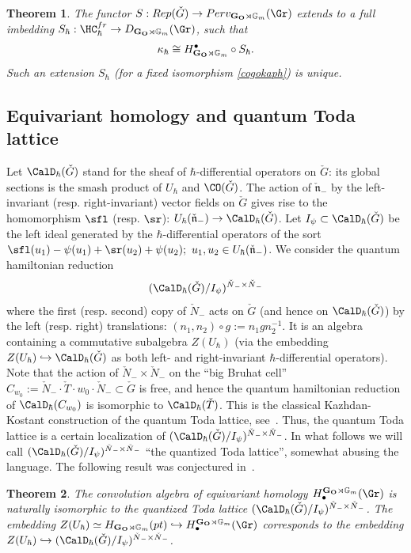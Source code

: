 \documentclass[11pt]{amsart}
\newtheorem{thm}{Theorem}
\theoremstyle{definition}
\theoremstyle{remark}
\theoremstyle{remark}
\newcommand{\<}{\langle}
\renewcommand{\>}{\rangle}
\newcommand{\Ln}{\check{\mathfrak n}{}}
\newcommand{\LN}{\check{N}{}}
\newcommand{\LG}{{\check{G}}}
\newcommand{\LT}{\check{T}{}}
\newcommand{\GO}{{\bf G_O}}
\newcommand{\Gm}{{{\mathbb G}_m}}
\newcommand{\Sa}{S}
\newcommand{\HChfr}{\HC_\hbar^{fr}}
\newcommand{\kappah}{{\kappa_\hbar}}
\begin{document}
\begin{thm}
\label{free_cohh}
The functor $\Sa: Rep(\LG)\to Perv_{\GO\rtimes \Gm}(\Gr)$ 
extends to a full imbedding $\Sa_\hbar:\HChfr \to
D_{\GO\rtimes \Gm}(\Gr)$, such that 
\begin{equation}\label{cogokaph}
\kappah \cong H_{\GO\rtimes\Gm}^\bullet\circ \Sa_\hbar.
\end{equation}
Such an extension $\Sa_\hbar$ (for a  fixed isomorphism \eqref{cogokaph})
is unique.
\end{thm}



\subsection{Equivariant homology and quantum Toda lattice}
Let $\CalD_\hbar(\LG)$ stand for the sheaf of $\hbar$-differential
operators on $\LG$: its global sections is the smash product of 
$U_\hbar$ and $\CO(\LG)$. The action of $\Ln_-$ by the left-invariant
(resp. right-invariant) vector fields on $\LG$ gives rise to the
homomorphism $\sfl$ (resp. $\sr$): $U_\hbar(\Ln_-)\to\CalD_\hbar(\LG)$.
Let $I_\psi\subset\CalD_\hbar(\LG)$ be the left ideal generated by the
$\hbar$-differential operators of the sort
$\sfl(u_1)-\psi(u_1)+\sr(u_2)+\psi(u_2);\ u_1,u_2\in U_\hbar(\Ln_-)$.
We consider the quantum hamiltonian reduction 
$$(\CalD_\hbar(\LG)/I_\psi)^{\LN_-\times\LN_-}$$
where the first (resp. second) copy of $\LN_-$ acts on $\LG$ (and hence
on $\CalD_\hbar(\LG)$) by the left
(resp. right) translations: $(n_1,n_2)\circ g:=n_1gn_2^{-1}$. 
It is an algebra containing a commutative subalgebra $Z(U_\hbar)$
(via the embedding $Z(U_\hbar)\hookrightarrow\CalD_\hbar(\LG)$ as both
left- and right-invariant $\hbar$-differential operators).
Note that the action of $\LN_-\times\LN_-$ on the ``big Bruhat cell'' 
$C_{w_0}:=\LN_-\cdot\LT\cdot w_0\cdot\LN_-\subset\LG$ is free, and
hence the quantum hamiltonian reduction of $\CalD_\hbar(C_{w_0})$ is
isomorphic to $\CalD_\hbar(\LT)$. This is the classical
Kazhdan-Kostant construction of the quantum Toda lattice,
see~\cite{K2}. Thus, the quantum Toda lattice is a certain
localization of $(\CalD_\hbar(\LG)/I_\psi)^{\LN_-\times\LN_-}$.
In what follows we will call
$(\CalD_\hbar(\LG)/I_\psi)^{\LN_-\times\LN_-}$ ``the quantized Toda
lattice'', somewhat abusing the language. 
The following result was conjectured in~\cite{BFM}.

\begin{thm}
\label{TodaTh}
The convolution algebra of equivariant homology
$H^{\GO\rtimes \Gm}_\bullet(\Gr)$ is naturally isomorphic to the
quantized Toda lattice $(\CalD_\hbar(\LG)/I_\psi)^{\LN_-\times\LN_-}$.
The embedding $Z(U_\hbar)\simeq H_{\GO\rtimes\Gm}(pt)\hookrightarrow 
H^{\GO\rtimes\Gm}_\bullet(\Gr)$ corresponds to the embedding
$Z(U_\hbar)\hookrightarrow(\CalD_\hbar(\LG)/I_\psi)^{\LN_-\times\LN_-}$.
\end{thm}
\end{document}
